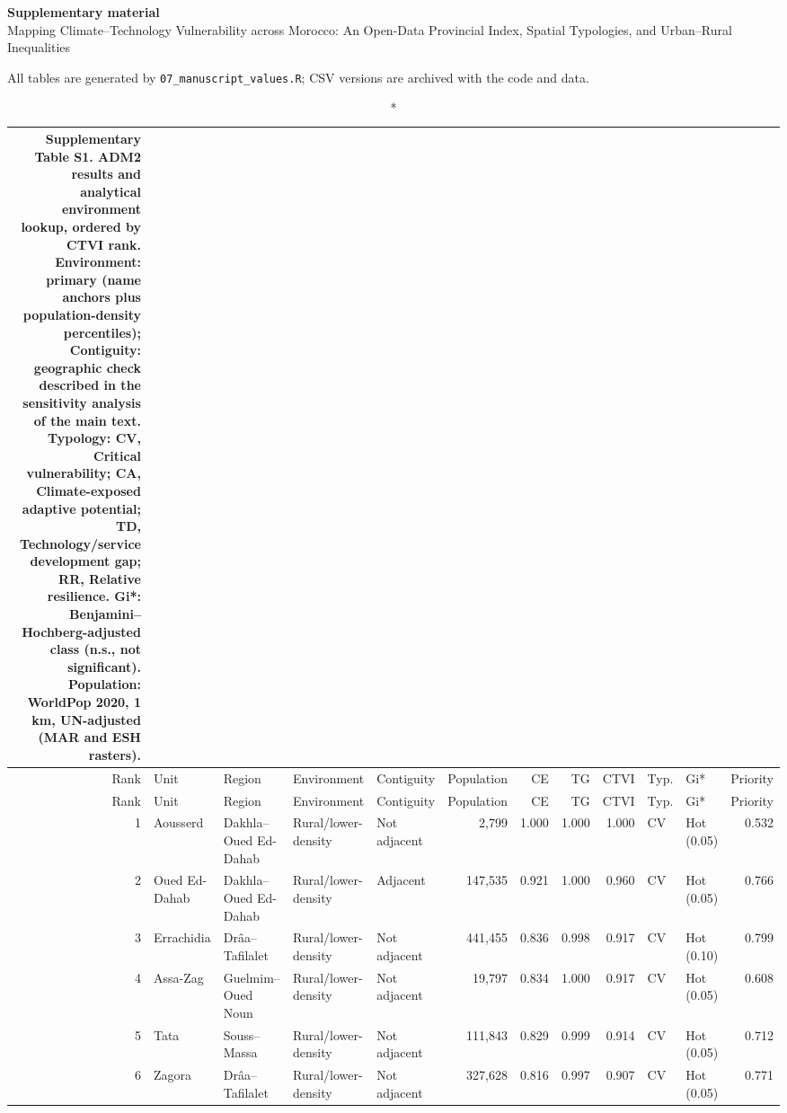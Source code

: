 \documentclass[10pt]{article}
\begin{document}
\begin{center}{\large\bfseries Supplementary material}\\[4pt]
Mapping Climate--Technology Vulnerability across Morocco: An Open-Data Provincial Index, Spatial Typologies, and Urban--Rural Inequalities\end{center}

\noindent All tables are generated by \texttt{07\_manuscript\_values.R}; CSV versions are archived with the code and data.

\scriptsize
\begin{longtable}{@{}r>{\raggedright\arraybackslash}p{2.9cm}>{\raggedright\arraybackslash}p{3.3cm}llrrrrllr@{}}
\caption*{\normalsize\textbf{Supplementary Table S1.} ADM2 results and analytical environment lookup, ordered by CTVI rank. Environment: primary (name anchors plus population-density percentiles); Contiguity: geographic check described in the sensitivity analysis of the main text. Typology: CV, Critical vulnerability; CA, Climate-exposed adaptive potential; TD, Technology/service development gap; RR, Relative resilience. Gi*: Benjamini--Hochberg-adjusted class (n.s., not significant). Population: WorldPop 2020, 1 km, UN-adjusted (MAR and ESH rasters).}\\
\toprule
Rank & Unit & Region & Environment & Contiguity & Population & CE & TG & CTVI & Typ. & Gi* & Priority \\
\midrule\endfirsthead
\toprule
Rank & Unit & Region & Environment & Contiguity & Population & CE & TG & CTVI & Typ. & Gi* & Priority \\
\midrule\endhead
1 & Aousserd & Dakhla--Oued Ed-Dahab & Rural/lower-density & Not adjacent & 2,799 & 1.000 & 1.000 & 1.000 & CV & Hot (0.05) & 0.532 \\
2 & Oued Ed-Dahab & Dakhla--Oued Ed-Dahab & Rural/lower-density & Adjacent & 147,535 & 0.921 & 1.000 & 0.960 & CV & Hot (0.05) & 0.766 \\
3 & Errachidia & Drâa--Tafilalet & Rural/lower-density & Not adjacent & 441,455 & 0.836 & 0.998 & 0.917 & CV & Hot (0.10) & 0.799 \\
4 & Assa-Zag & Guelmim--Oued Noun & Rural/lower-density & Not adjacent & 19,797 & 0.834 & 1.000 & 0.917 & CV & Hot (0.05) & 0.608 \\
5 & Tata & Souss--Massa & Rural/lower-density & Not adjacent & 111,843 & 0.829 & 0.999 & 0.914 & CV & Hot (0.05) & 0.712 \\
6 & Zagora & Drâa--Tafilalet & Rural/lower-density & Not adjacent & 327,628 & 0.816 & 0.997 & 0.907 & CV & Hot (0.05) & 0.771 \\

\end{longtable}
\end{document}
